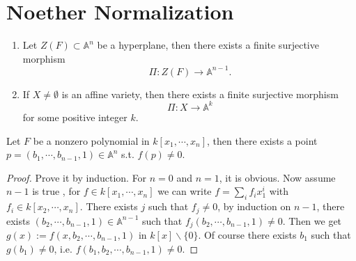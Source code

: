 \section{Noether Normalization}


\begin{theorem}\label{14-1}
  {}
  \noindent
	\begin{enumerate}
		\item Let $ Z(F) \subset \mathbb{A}^n$ be a hyperplane, then there exists a finite surjective morphism
		      $$
			      \Pi:Z(F)\to \mathbb{A}^{n-1}.
		      $$
		\item If $ X\neq \emptyset  $ is an affine variety, then there exists a finite surjective morphism
		      $$
			      \Pi:X\to \mathbb{A}^k
		      $$
		      for some positive integer $ k $.
	\end{enumerate}
\end{theorem}
\begin{lemma}
	Let $ F $ be a nonzero polynomial in $ k[x_1,\cdots,x_n] $, then there exists a point $ p=(b_1,\cdots,b_{n-1},1)\in\mathbb{A}^n $ s.t. $ f(p)\neq 0 $.
\end{lemma}
\begin{proof}
	Prove it by induction. For $ n=0 $ and $ n=1 $, it is obvious. Now assume $ n-1 $ is true , for $ f\in k[x_1,\cdots,x_n] $ we can write $ f=\sum\limits_{i}f_ix_1^i $ with $ f_i\in k[x_2,\cdots,x_{n}] $. There exists $ j $ such that $ f_j\neq 0$, by induction on $ n-1 $, there exists $ (b_2,\cdots,b_{n-1},1)\in \mathbb{A}^{n-1} $ such that $ f_j(b_2,\cdots,b_{n-1},1)\neq 0 $. Then we get $ g(x):=f(x,b_2,\cdots,b_{n-1},1) $ in $ k[x]\backslash\lbrace 0 \rbrace $. Of course there exists  $ b_1 $ such that $ g(b_1)\neq 0 $, i.e. $ f(b_1,b_2,\cdots,b_{n-1},1)\neq 0 $.
\end{proof}
